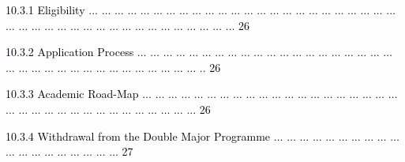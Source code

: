 \documentclass[12pt]{article}
\begin{document}
\vspace{\baselineskip}
\begin{adjustwidth}{0.5in}{0.0in}
{\fontsize{7pt}{8.4pt}\selectfont \textcolor[HTML]{00000A}{10.3.1 Eligibility $ \ldots $ $ \ldots $ $ \ldots $ $ \ldots $ $ \ldots $ $ \ldots $ $ \ldots $ $ \ldots $ $ \ldots $ $ \ldots $ $ \ldots $ $ \ldots $ $ \ldots $ $ \ldots $ $ \ldots $ $ \ldots $ $ \ldots $ $ \ldots $ $ \ldots $ $ \ldots $ $ \ldots $ $ \ldots $ $ \ldots $ $ \ldots $ $ \ldots $ $ \ldots $ $ \ldots $ $ \ldots $ $ \ldots $ $ \ldots $ $ \ldots $ $ \ldots $ $ \ldots $ $ \ldots $ $ \ldots $ $ \ldots $ $ \ldots $ $ \ldots $ $ \ldots $ $ \ldots $ $ \ldots $ $ \ldots $  26}\par}\par

\end{adjustwidth}


\vspace{\baselineskip}
\begin{adjustwidth}{0.5in}{0.0in}
{\fontsize{7pt}{8.4pt}\selectfont \textcolor[HTML]{00000A}{10.3.2 Application Process $ \ldots $ $ \ldots $ $ \ldots $ $ \ldots $ $ \ldots $ $ \ldots $ $ \ldots $ $ \ldots $ $ \ldots $ $ \ldots $ $ \ldots $ $ \ldots $ $ \ldots $ $ \ldots $ $ \ldots $ $ \ldots $ $ \ldots $ $ \ldots $ $ \ldots $ $ \ldots $ $ \ldots $ $ \ldots $ $ \ldots $ $ \ldots $ $ \ldots $ $ \ldots $ $ \ldots $ $ \ldots $ $ \ldots $ $ \ldots $ $ \ldots $ $ \ldots $ $ \ldots $ $ \ldots $ $ \ldots $ .. 26}\par}\par

\end{adjustwidth}


\vspace{\baselineskip}
\begin{adjustwidth}{0.5in}{0.0in}
{\fontsize{7pt}{8.4pt}\selectfont \textcolor[HTML]{00000A}{10.3.3 Academic Road-Map $ \ldots $ $ \ldots $ $ \ldots $ $ \ldots $ $ \ldots $ $ \ldots $ $ \ldots $ $ \ldots $ $ \ldots $ $ \ldots $ $ \ldots $ $ \ldots $ $ \ldots $ $ \ldots $ $ \ldots $ $ \ldots $ $ \ldots $ $ \ldots $ $ \ldots $ $ \ldots $ $ \ldots $ $ \ldots $ $ \ldots $ $ \ldots $ $ \ldots $ $ \ldots $ $ \ldots $ $ \ldots $ $ \ldots $ $ \ldots $ $ \ldots $ $ \ldots $ $ \ldots $ $ \ldots $ ... 26}\par}\par

\end{adjustwidth}


\vspace{\baselineskip}
\begin{adjustwidth}{0.5in}{0.0in}
{\fontsize{7pt}{8.4pt}\selectfont \textcolor[HTML]{00000A}{10.3.4 Withdrawal from the Double Major Programme $ \ldots $ $ \ldots $ $ \ldots $ $ \ldots $ $ \ldots $ $ \ldots $ $ \ldots $ $ \ldots $ $ \ldots $ $ \ldots $ $ \ldots $ $ \ldots $ $ \ldots $ $ \ldots $ $ \ldots $ $ \ldots $ $ \ldots $ $ \ldots $ $ \ldots $  27}\par}\par

\end{adjustwidth}
\end{document}

